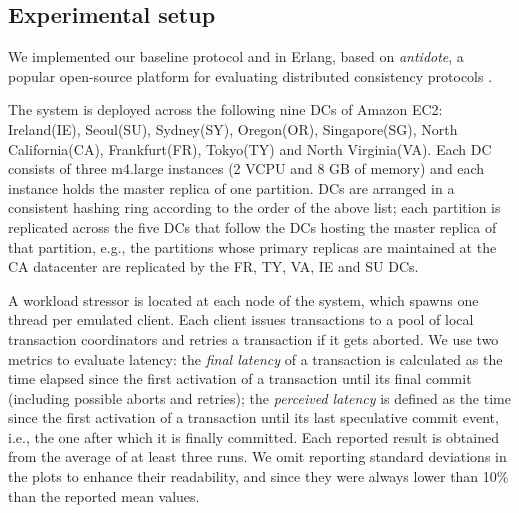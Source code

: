 
\subsection{Experimental setup}
\label{subsec:setup}
We implemented our baseline protocol and \specula in  Erlang, based on \textit{antidote}, a popular open-source platform for evaluating distributed consistency protocols \cite{antidote}.

The system is deployed across the following nine DCs of Amazon EC2: Ireland(IE), Seoul(SU), Sydney(SY), Oregon(OR), Singapore(SG), North California(CA), Frankfurt(FR),  Tokyo(TY) and North Virginia(VA). Each DC consists of three m4.large instances (2 VCPU and 8 GB of memory) and each instance holds the master replica of one partition.  DCs are arranged in a consistent hashing ring according to the order of the above list; each partition is replicated across the five DCs that follow the DCs hosting the master replica of that partition, e.g., 
 the  partitions whose primary replicas are maintained at the CA datacenter are replicated by the 
 FR, TY, VA, IE and SU DCs. %
 
 

A workload stressor is located at each node of the system, which spawns one thread per emulated client. Each client issues transactions to a pool of local transaction coordinators and retries a transaction if it gets aborted. We use two metrics to evaluate latency: the \textit{final latency} of a transaction is calculated as the time elapsed since the first activation of a transaction  until its final commit (including possible aborts and retries); the \textit{perceived latency} is defined as the time since the first activation of a transaction until its last speculative commit event, i.e., the one after which it is finally committed. Each reported result is obtained  from the average of at least three runs. We omit reporting standard deviations in the plots to enhance their readability, and since they were always lower than 10\% than the reported mean values.

